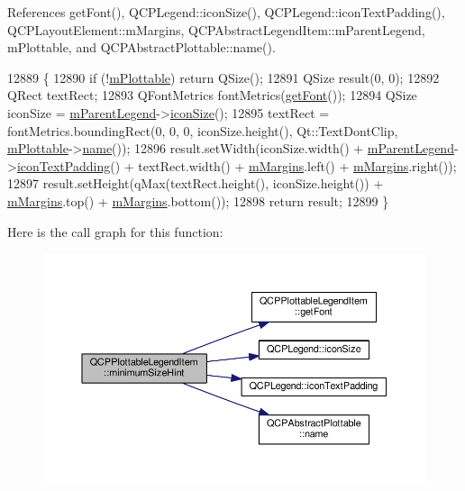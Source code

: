 References get\+Font(), Q\+C\+P\+Legend\+::icon\+Size(), Q\+C\+P\+Legend\+::icon\+Text\+Padding(), Q\+C\+P\+Layout\+Element\+::m\+Margins, Q\+C\+P\+Abstract\+Legend\+Item\+::m\+Parent\+Legend, m\+Plottable, and Q\+C\+P\+Abstract\+Plottable\+::name().


\begin{DoxyCode}
12889 \{
12890   \textcolor{keywordflow}{if} (!\hyperlink{class_q_c_p_plottable_legend_item_ada647fb4b22971a1a424e15b4f6af0d9}{mPlottable}) \textcolor{keywordflow}{return} QSize();
12891   QSize result(0, 0);
12892   QRect textRect;
12893   QFontMetrics fontMetrics(\hyperlink{class_q_c_p_plottable_legend_item_a8a85c8a25affb4895423d730164d61de}{getFont}());
12894   QSize iconSize = \hyperlink{class_q_c_p_abstract_legend_item_aafcd9fc6fcb10f4a8d46037011afafe8}{mParentLegend}->\hyperlink{class_q_c_p_legend_a27dfb770b14adc0e8811bef8129780a5}{iconSize}();
12895   textRect = fontMetrics.boundingRect(0, 0, 0, iconSize.height(), Qt::TextDontClip, 
      \hyperlink{class_q_c_p_plottable_legend_item_ada647fb4b22971a1a424e15b4f6af0d9}{mPlottable}->\hyperlink{class_q_c_p_abstract_plottable_a1affc1972938e4364a9325e4e4e4dcea}{name}());
12896   result.setWidth(iconSize.width() + \hyperlink{class_q_c_p_abstract_legend_item_aafcd9fc6fcb10f4a8d46037011afafe8}{mParentLegend}->\hyperlink{class_q_c_p_legend_a9d6d07042a284c4ba5f9e3cb5c9281ef}{iconTextPadding}() + 
      textRect.width() + \hyperlink{class_q_c_p_layout_element_ac2a32b99ee527ca5dfff9da03628fe94}{mMargins}.left() + \hyperlink{class_q_c_p_layout_element_ac2a32b99ee527ca5dfff9da03628fe94}{mMargins}.right());
12897   result.setHeight(qMax(textRect.height(), iconSize.height()) + \hyperlink{class_q_c_p_layout_element_ac2a32b99ee527ca5dfff9da03628fe94}{mMargins}.top() + 
      \hyperlink{class_q_c_p_layout_element_ac2a32b99ee527ca5dfff9da03628fe94}{mMargins}.bottom());
12898   \textcolor{keywordflow}{return} result;
12899 \}
\end{DoxyCode}


Here is the call graph for this function\+:\nopagebreak
\begin{figure}[H]
\begin{center}
\leavevmode
\includegraphics[width=350pt]{class_q_c_p_plottable_legend_item_a76bad654ebc8e870392f488419a6a483_cgraph}
\end{center}
\end{figure}


